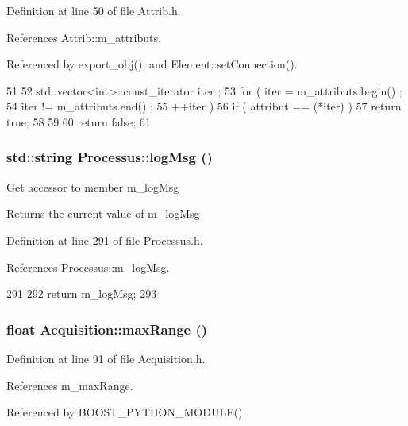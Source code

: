 Definition at line 50 of file Attrib.h.

References Attrib::m\_\-attributs.

Referenced by export\_\-obj(), and Element::setConnection().


\begin{DoxyCode}
51   {
52     std::vector<int>::const_iterator iter ;
53     for ( iter  = m_attributs.begin() ;
54           iter != m_attributs.end()   ;
55           ++iter ) {
56       if ( attribut == (*iter) ) {
57         return true;
58       }
59     }
60     return false;
61   }
\end{DoxyCode}
\hypertarget{classProcessus_a42fdeb17dc13ba854222666b6aa29b61}{
\subsubsection[{logMsg}]{\setlength{\rightskip}{0pt plus 5cm}std::string Processus::logMsg ()}}
\label{classProcessus_a42fdeb17dc13ba854222666b6aa29b61}
Get accessor to member m\_\-logMsg \begin{DoxyReturn}{Returns}
the current value of m\_\-logMsg 
\end{DoxyReturn}


Definition at line 291 of file Processus.h.

References Processus::m\_\-logMsg.


\begin{DoxyCode}
291                       {
292     return m_logMsg;
293   }
\end{DoxyCode}
\hypertarget{classAcquisition_a386f3ebc6b1d4956aa7e40b314ddb4eb}{
\subsubsection[{maxRange}]{\setlength{\rightskip}{0pt plus 5cm}float Acquisition::maxRange ()}}
\label{classAcquisition_a386f3ebc6b1d4956aa7e40b314ddb4eb}


Definition at line 91 of file Acquisition.h.

References m\_\-maxRange.

Referenced by BOOST\_\-PYTHON\_\-MODULE().


